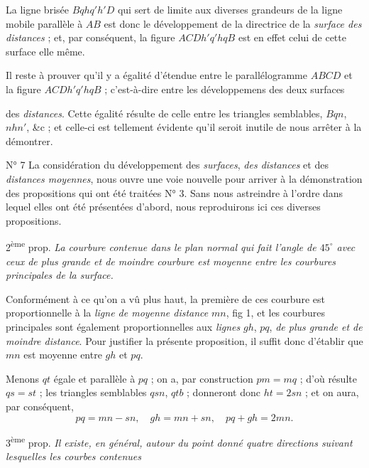 \documentclass[11pt,a4paper]{article}
\begin{document}
La ligne brisée $Bqhq'h'D$ qui sert de limite aux diverses grandeurs de la
ligne mobile parallèle à $AB$ est donc le développement de la directrice de
la \emph{surface des distances} ; et, par conséquent, la figure
$ACDh'q'hqB$ est en effet celui de cette surface elle même.

Il reste à prouver qu'il y a égalité d'étendue entre le parallélogramme
$ABCD$ et la figure $ACDh'q'hqB$ ; c'est-à-dire entre les développemens des
deux surfaces


des \emph{distances}. Cette égalité résulte de celle entre les triangles
semblables, $Bqn$, $nhn'$, \&c ; et celle-ci est tellement évidente qu'il
seroit inutile de nous arrêter à la démontrer.

N° 7 La considération du développement des \emph{surfaces}, \emph{des distances}
et des \emph{distances moyennes}, nous ouvre une voie nouvelle pour arriver
à la démonstration des propositions qui ont été traitées N° 3. Sans nous
astreindre à l'ordre dans lequel elles ont été présentées d'abord, nous
reproduirons ici ces diverses propositions.

2\textsuperscript{ème} prop. \emph{La courbure contenue dans le plan normal qui
fait l'angle de $45^{\circ}$ avec ceux de plus grande et de moindre courbure
est moyenne entre les courbures principales de la surface.}

Conformément à ce qu'on a vû plus haut, la première de ces courbure est
proportionnelle à la \emph{ligne de moyenne distance} $mn$, fig 1, et les
courbures principales sont également proportionnelles aux \emph{lignes}
$gh$, $pq$, \emph{de plus grande et de moindre distance}. Pour justifier la
présente proposition, il suffit donc d'établir que $mn$ est moyenne entre
$gh$ et $pq$.

Menons $qt$ égale et parallèle à $pq$ ; on a, par construction $pm = mq$ ;
d'où résulte $qs = st$ ; les triangles semblables $qsn$, $qtb$ ; donneront
donc $ht = 2sn$ ; et on aura, par conséquent,
\[ pq = mn - sn, \quad gh = mn + sn, \quad pq + gh = 2mn . \]


3\textsuperscript{ème} prop. \emph{Il existe, en général, autour du point donné
quatre directions suivant lesquelles les courbes contenues}
\end{document}
